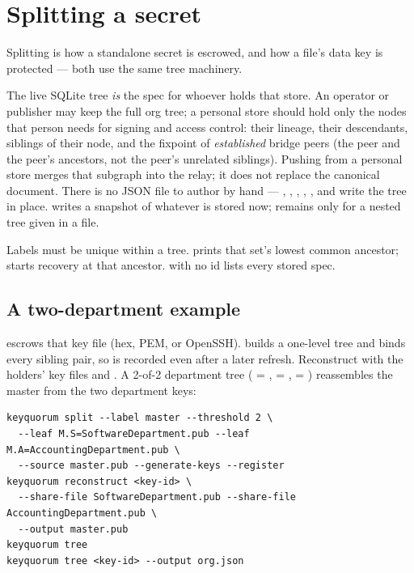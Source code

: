\section{Splitting a secret}
\label{sec:splitting-secrets}

Splitting is how a standalone secret is escrowed, and how a file's data key
is protected --- both use the same tree machinery.

\begin{noteBox}
The live SQLite tree \emph{is} the spec for whoever holds that store. An
operator or publisher may keep the full org tree; a personal store should
hold only the nodes that person needs for signing and access control: their
lineage, their descendants, siblings of their node, and the fixpoint of
\emph{established} bridge peers (the peer and the peer's ancestors, not the
peer's unrelated siblings). Pushing from a personal store merges that
subgraph into the relay; it does not replace the canonical document. There
is no JSON file to author by hand --- , , ,
, , and 
write the tree in place.  writes a snapshot of whatever
is stored now;  remains only for a nested
tree given in a file.
\end{noteBox}

Labels must be unique within a tree.  prints
that set's lowest common ancestor;  starts
recovery at that ancestor.  with no id lists every stored spec.

\subsection{A two-department example}

 escrows that key file (hex, PEM, or
OpenSSH).  builds a one-level tree and binds every sibling
pair, so  is recorded even after a later refresh.
Reconstruct with the holders' key files and . A 2-of-2
department tree ( = ,  =
,  =
) reassembles the master from the two
department keys:

\begin{lstlisting}
keyquorum split --label master --threshold 2 \
  --leaf M.S=SoftwareDepartment.pub --leaf M.A=AccountingDepartment.pub \
  --source master.pub --generate-keys --register
keyquorum reconstruct <key-id> \
  --share-file SoftwareDepartment.pub --share-file AccountingDepartment.pub \
  --output master.pub
keyquorum tree
keyquorum tree <key-id> --output org.json
\end{lstlisting}

